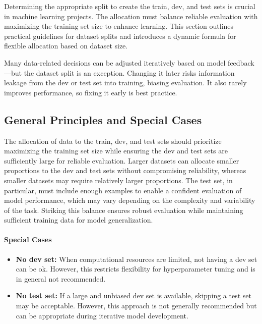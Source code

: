 \documentclass[12pt,openany]{book}
\begin{document}
Determining the appropriate split to create the train, dev, and test sets is crucial in machine learning projects. The allocation must balance reliable evaluation with maximizing the training set size to enhance learning. This section outlines practical guidelines for dataset splits and introduces a dynamic formula for flexible allocation based on dataset size.

\begin{notebox}
Many data-related decisions can be adjusted iteratively based on model feedback—but the dataset split is an exception. Changing it later risks information leakage from the dev or test set into training, biasing evaluation. It also rarely improves performance, so fixing it early is best practice.
\end{notebox}


\subsection{General Principles and Special Cases}

The allocation of data to the train, dev, and test sets should prioritize maximizing the training set size while ensuring the dev and test sets are sufficiently large for reliable evaluation. Larger datasets can allocate smaller proportions to the dev and test sets without compromising reliability, whereas smaller datasets may require relatively larger proportions. The test set, in particular, must include enough examples to enable a confident evaluation of model performance, which may vary depending on the complexity and variability of the task. Striking this balance ensures robust evaluation while maintaining sufficient training data for model generalization.

\paragraph{Special Cases}
\begin{itemize}
    \item \textbf{No dev set:} When computational resources are limited, not having a dev set can be ok. However, this restricts flexibility for hyperparameter tuning and is in general not recommended.
    \item \textbf{No test set:} If a large and unbiased dev set is available, skipping a test set may be acceptable. However, this approach is not generally recommended but can be appropriate during iterative model development.
\end{itemize}
\end{document}
